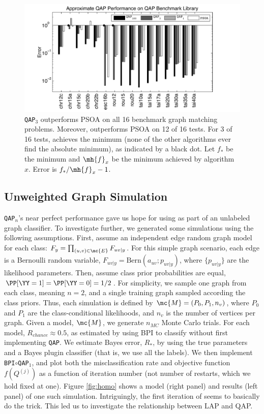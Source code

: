 \documentclass[10pt,journal,cspaper,compsoc]{IEEEtran}
\begin{document}
\begin{figure}[htbp]
	\centering			
	\includegraphics[width=1.0\linewidth]{../figs/benchmarks.pdf}
	\caption{\texttt{QAP}$_3$ outperforms PSOA on all 16 benchmark graph matching problems.  Moreover, \qapa outperforms PSOA on 12 of 16 tests.  For 3 of 16 tests, \qapb achieves the minimum (none of the other algorithms ever find the absolute minimum), as indicated by a black dot.  Let $f_*$ be the minimum and $\mh{f}_x$ be the minimum achieved by algorithm $x$.  Error is $f_*/\mh{f}_x-1$.  }
	\label{fig:fwpath}
\end{figure}




\subsection{Unweighted Graph Simulation}

\texttt{QAP}$_n$'s near perfect performance gave us hope for using \qap as part of an unlabeled graph classifier.  To investigate further, we generated some simulations using the following assumptions.  First, assume an independent edge random graph model for each class: $F_y=\prod_{(u,v) \in \mc{E}} F_{uv|y}$.  For this simple graph scenario, each edge is a Bernoulli random variable, $F_{uv|y}=\text{Bern}(a_{uv}; p_{uv|y})$, where $\{p_{uv|y}\}$ are the likelihood parameters.  Then, assume class prior probabilities are equal, $\PP[\YY=1]=\PP[\YY=0]=1/2$.  For simplicity, we sample one graph from each class, meaning $n=2$, and a single training graph sampled according the class priors. Thus, each simulation is defined by $\mc{M}=(P_0,P_1,n_v)$, where $P_0$ and $P_1$ are the class-conditional likelihoods, and $n_v$ is the number of vertices per graph.  Given a model, $\mc{M}$, we generate $n_{MC}$ Monte Carlo trials.  For each model, $R_{chance}\approx 0.5$, as estimated by using BPI to classify without first implementing \texttt{QAP}.  We estimate Bayes error, $R_*$, by using the true parameters and a Bayes plugin classifier (that is, we use all the labels).  We then implement \texttt{BPI}$\circ$\texttt{QAP}$_1$, and plot both the misclassification rate and objective function $f(Q^{(j)})$ as a function of iteration number (not number of restarts, which we hold fixed at one). Figure \ref{fig:homo} shows a model (right panel) and results (left panel) of one such simulation. Intriguingly, the first iteration of \qapa seems to basically do the trick.  This led us to investigate the relationship between LAP and QAP.
\end{document}
